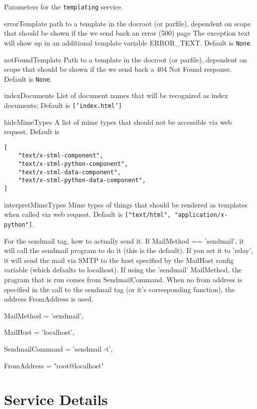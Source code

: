 \documentclass[titlepage]{manual}
\begin{document}
Parameters for the \texttt{templating} service.
\begin{argdesc}
\item[errorTemplate] \nonscope
path to a template in the docroot (or parfile), dependent on scope
that should be shown if the we send back an error (500) page
The exception text will show up in an additional template variable
ERROR_TEXT.
Default is \texttt{None}.
\item[notFoundTemplate] \nonscope
Path to a template in the docroot (or parfile), dependent on scope
that should be shown if the we send back a 404 Not Found response.
Default is \texttt{None}.
\item[indexDocuments]
List of document names that will be recognized as index documents;
Default is \texttt{['index.html']}
\item[hideMimeTypes]
A list of mime types that should not be accessible via web request.
Default is 
\begin{verbatim}
[
    "text/x-stml-component",
    "text/x-stml-python-component",
    "text/x-stml-data-component",
    "text/x-stml-python-data-component",
]
\end{verbatim}
\item[interpretMimeTypes]
Mime types of things that should be rendered as templates when called
via web request.
Default is \texttt{["text/html", "application/x-python"]}.
\end{argdesc}

For the sendmail tag, how to actually send it.
If MailMethod == 'sendmail', it will call the sendmail program to do
it (this is the default).  If you set it to 'relay', it will send the
mail via SMTP to the host specified by the MailHost config variable
(which defaults to localhost).  If using the 'sendmail' MailMethod,
the pragram that is run comes from SendmailCommand.  When no from
address is specified in the call to the sendmail tag (or it's
corresponding function), the address FromAddress is used.
\begin{argdesc}
\item[MailMethod] = 'sendmail',
\item[MailHost] = 'localhost',
\item[SendmailCommand] = 'sendmail -t',
\item[FromAddress] = "root@localhost"
\end{argdesc}



\chapter{Service Details}
\end{document}
